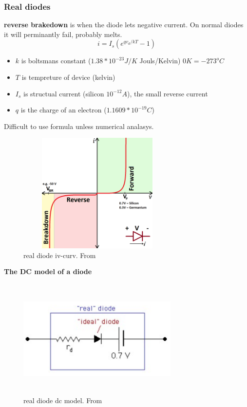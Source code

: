\subsubsection{Real diodes}
\textbf{reverse brakedown} is when the diode lets negative current. 
On normal diodes it will perminantly fail, probably melts.
\begin{equation}
  i=I_s(e^{qv_d/kT}-1)
\end{equation}
\begin{itemize}
  \item  $k$ is boltsmans constant ($1.38*10^{-23}J/K$ Jouls/Kelvin) $0K=-273^oC$
  \item  $T$ is tempreture of device (kelvin)
  \item  $I_s$ is structual current (silicon $10^{-12}A$), the small reverse current
  \item  $q$ is the charge of an electron ($1.1609*10^{-19}C$)
\end{itemize}

Difficult to use formula unless numerical analasys.

\begin{figure}[h]
    \centering
    \includegraphics[width=8cm, height=6cm]{image/real-diode.png}
    \caption{real diode iv-curv. From \cite{}}
\end{figure}

\newpage
\textbf{The DC model of a diode}
\begin{figure}[h]
    \centering
    \includegraphics[width=8cm, height=6cm]{image/real_diode_dc.png}
    \caption{real diode dc model. From \cite{}}
\end{figure}


